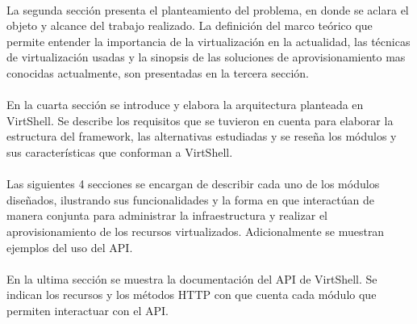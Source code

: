 \documentclass[conference, spanish]{IEEEtran}
\begin{document}
\\
La segunda sección presenta el planteamiento del problema, en donde se aclara el objeto y alcance del trabajo realizado. La definición del marco teórico que permite entender la importancia de la virtualización en la actualidad, las técnicas de virtualización usadas y la sinopsis de las soluciones de aprovisionamiento mas conocidas actualmente, son presentadas en la tercera sección.\\
\\
En la cuarta sección se introduce y elabora la arquitectura planteada en VirtShell. Se describe los requisitos que se tuvieron en cuenta para elaborar la estructura del framework, las alternativas estudiadas y se reseña los módulos y sus características que conforman a VirtShell.\\
\\
Las siguientes 4 secciones se encargan de describir cada uno de los módulos diseñados, ilustrando sus funcionalidades y la forma en que interactúan de manera conjunta para administrar la infraestructura y realizar el aprovisionamiento de los recursos virtualizados. Adicionalmente se muestran ejemplos del uso del API.\\
\\
En la ultima sección se muestra la documentación del API de VirtShell. Se indican los recursos y los métodos HTTP con que cuenta cada módulo que permiten interactuar con el API.\\
\end{document}
